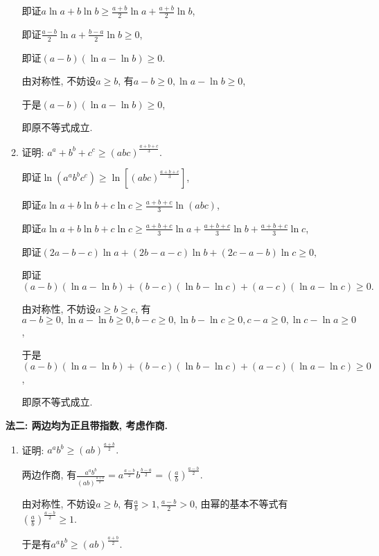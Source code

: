 \documentclass[8pt]{article}
\begin{document}
\begin{enumerate}[label=(\arabic*)]
\begin{enumerate}[label=(\arabic*)]
					即证$a\ln{a}+b\ln{b}\geq\displaystyle \frac{a+b}{2}\ln{a}+\frac{a+b}{2}\ln{b}$,

					即证$\displaystyle \frac{a-b}{2} \ln{a} + \frac{b-a}{2} \ln{b} \geq 0$,

					即证$\displaystyle (a-b)(\ln a-\ln b)\geq 0$.

					由对称性, 不妨设$a\geq b$, 有$a-b \geq 0, \ln a-\ln b \geq 0$,

					于是$\displaystyle (a-b)(\ln a-\ln b)\geq 0$,

					即原不等式成立.

				\item 证明: $a^a+b^b+c^c\geq\displaystyle (abc)^{\frac{a+b+c}{3}}.$

					即证$\ln{(a^a b^b c^c)}\geq\displaystyle \ln{\left[(abc)^{\frac{a+b+c}{3}}\right]}$,

					即证$a\ln{a}+b\ln{b}+c\ln{c}\geq\displaystyle \frac{a+b+c}{3}\ln{(abc)}$,

					即证$a\ln{a}+b\ln{b}+c\ln{c}\geq\displaystyle \frac{a+b+c}{3}\ln{a}+\frac{a+b+c}{3}\ln{b}+\frac{a+b+c}{3}\ln{c}$,

					即证$\displaystyle (2a-b-c)\ln{a}+(2b-a-c)\ln{b}+(2c-a-b)\ln{c}\geq 0,$

					即证$(a-b)(\ln{a}-\ln{b})+(b-c)(\ln{b}-\ln{c})+(a-c)(\ln{a}-\ln{c})\geq 0.$

					由对称性, 不妨设$a\geq b \geq c$, 有$a-b \geq 0, \ln a-\ln b \geq 0, b-c \geq 0, \ln b-\ln c \geq 0, c-a \geq 0, \ln c-\ln a \geq 0$,

					于是$(a-b)(\ln{a}-\ln{b})+(b-c)(\ln{b}-\ln{c})+(a-c)(\ln{a}-\ln{c})\geq 0$,

					即原不等式成立.
			\end{enumerate}

			\textbf{法二: 两边均为正且带指数, 考虑作商.}


			\begin{enumerate}[label=(\arabic*)]
				\item 证明: $a^ab^b\geq\displaystyle (ab)^{\frac{a+b}{2}}.$

					两边作商, 有$\displaystyle \frac{a^a b^b}{(ab)^{\frac{a+b}{2}}}=a^{\frac{a-b}{2}}b^{\frac{b-a}{2}}=\left(\frac{a}{b}\right)^{\frac{a-b}{2}}.$

					由对称性, 不妨设$a\geq b$, 有$\displaystyle \frac{a}{b}>1, \frac{a-b}{2}>0$, 由幂的基本不等式有$\displaystyle \left(\frac{a}{b}\right)^{\frac{a-b}{2}}\geq 1.$

					于是有$a^ab^b\geq\displaystyle (ab)^{\frac{a+b}{2}}.$


\end{enumerate}
\end{enumerate}
\end{document}
